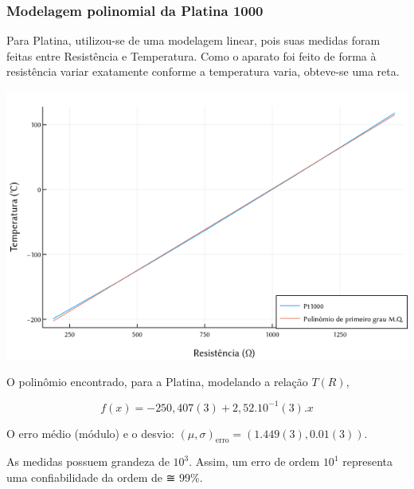 \documentclass[11pt]{article}
\begin{document}
\subsubsection{Modelagem polinomial da Platina 1000}
\label{sec:orgdbcbea0}
Para Platina, utilizou-se de uma modelagem linear, pois suas medidas foram feitas entre Resistência e Temperatura. Como o aparato foi feito de forma à resistência variar exatamente conforme a temperatura varia, obteve-se uma reta.

\href{img/polinomio-aluminio203.png}{\includegraphics[width=.9\linewidth]{./img/platina.png}}

O polinômio encontrado, para a Platina, modelando a relação \(T(R)\),

\begin{equation}
f(x)=-250,407(3) + 2,52.10^{-1}(3).x
\end{equation}

O erro médio (módulo) e o desvio: \((\mu, \sigma)_{\textrm{erro}} = (1.449(3), 0.01(3))\).

As medidas possuem grandeza de \(10^3\). Assim, um erro de ordem \(10^1\) representa uma confiabilidade da ordem de ≅ 99\%.
\end{document}
